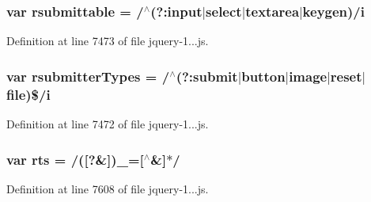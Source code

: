 \subsubsection[{rsubmittable}]{\setlength{\rightskip}{0pt plus 5cm}var rsubmittable = /$^\wedge$(?\+:input$\vert$select$\vert$textarea$\vert$keygen)/{\bf i}}\label{obj_2_release_2_package_2_package_tmp_2_scripts_2jquery-1_810_82_8js_a12d248d7e6c5985c5ea21f56fbef9e90}


Definition at line 7473 of file jquery-\/1...\+js.

\hypertarget{obj_2_release_2_package_2_package_tmp_2_scripts_2jquery-1_810_82_8js_a0e9cd4ca08945afe827846f34a36c74a}{}
\subsubsection[{rsubmitter\+Types}]{\setlength{\rightskip}{0pt plus 5cm}var rsubmitter\+Types = /$^\wedge$(?\+:submit$\vert${\bf button}$\vert$image$\vert$reset$\vert$file)\$/{\bf i}}\label{obj_2_release_2_package_2_package_tmp_2_scripts_2jquery-1_810_82_8js_a0e9cd4ca08945afe827846f34a36c74a}


Definition at line 7472 of file jquery-\/1...\+js.

\hypertarget{obj_2_release_2_package_2_package_tmp_2_scripts_2jquery-1_810_82_8js_a38ff30904f54277281a13514d7aea00d}{}
\subsubsection[{rts}]{\setlength{\rightskip}{0pt plus 5cm}var rts = /(\mbox{[}?\&\mbox{]})\+\_\+=\mbox{[}$^\wedge$\&\mbox{]}$\ast$/}\label{obj_2_release_2_package_2_package_tmp_2_scripts_2jquery-1_810_82_8js_a38ff30904f54277281a13514d7aea00d}


Definition at line 7608 of file jquery-\/1...\+js.


